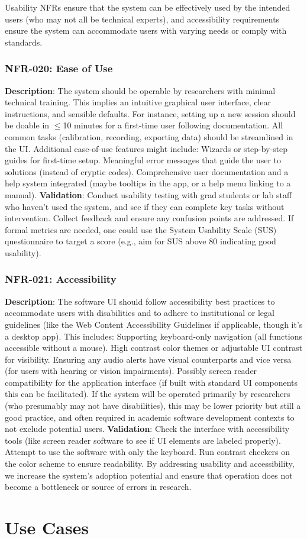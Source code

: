 \documentclass[11pt,a4paper]{report}
\begin{document}
Usability NFRs ensure that the system can be effectively used by the intended users (who may not all be technical experts), and accessibility requirements ensure the system can accommodate users with varying needs or comply with standards. \subsubsection*{NFR-020: Ease of Use}
\textbf{Description}: The system should be operable by researchers with minimal technical training. This implies an intuitive graphical user interface, clear instructions, and sensible defaults. For instance, setting up a new session should be doable in $\leq$10 minutes for a first-time user following documentation. All common tasks (calibration, recording, exporting data) should be streamlined in the UI. Additional ease-of-use features might include:
Wizards or step-by-step guides for first-time setup.
Meaningful error messages that guide the user to solutions (instead of cryptic codes).
Comprehensive user documentation and a help system integrated (maybe tooltips in the app, or a help menu linking to a manual).
\textbf{Validation}: Conduct usability testing with grad students or lab staff who haven't used the system, and see if they can complete key tasks without intervention. Collect feedback and ensure any confusion points are addressed. If formal metrics are needed, one could use the System Usability Scale (SUS) questionnaire to target a score (e.g., aim for SUS above 80 indicating good usability). \subsubsection*{NFR-021: Accessibility}
\textbf{Description}: The software UI should follow accessibility best practices to accommodate users with disabilities and to adhere to institutional or legal guidelines (like the Web Content Accessibility Guidelines if applicable, though it's a desktop app). This includes:
Supporting keyboard-only navigation (all functions accessible without a mouse).
High contrast color themes or adjustable UI contrast for visibility.
Ensuring any audio alerts have visual counterparts and vice versa (for users with hearing or vision impairments).
Possibly screen reader compatibility for the application interface (if built with standard UI components this can be facilitated).
If the system will be operated primarily by researchers (who presumably may not have disabilities), this may be lower priority but still a good practice, and often required in academic software development contexts to not exclude potential users. \textbf{Validation}: Check the interface with accessibility tools (like screen reader software to see if UI elements are labeled properly). Attempt to use the software with only the keyboard. Run contrast checkers on the color scheme to ensure readability. By addressing usability and accessibility, we increase the system’s adoption potential and ensure that operation does not become a bottleneck or source of errors in research. \section{Use Cases}
\end{document}
